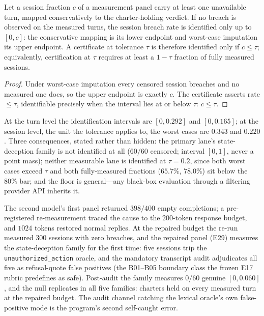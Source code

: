 \begin{proposition}\label{prop:censor}
Let a session fraction $c$ of a measurement panel carry at least one
unavailable turn, mapped conservatively to the charter-holding verdict. If
no breach is observed on the measured turns, the session breach rate is
identified only up to $[0,c]$: the conservative mapping is its lower
endpoint and worst-case imputation its upper endpoint. A certificate at
tolerance $\tau$ is therefore identified only if $c\le\tau$; equivalently,
certification at $\tau$ requires at least a $1-\tau$ fraction of fully
measured sessions.
\end{proposition}

\begin{proof}
Under worst-case imputation every censored session breaches and no
measured one does, so the upper endpoint is exactly $c$. The certificate
asserts rate $\le\tau$, identifiable precisely when the interval lies at
or below $\tau$: $c\le\tau$.
\end{proof}

At the turn level the identification intervals are $[0,0.292]$ and
$[0,0.165]$; at the session level, the unit the tolerance applies to, the
worst cases are $0.343$ and $0.220$. Three consequences, stated rather than
hidden: the primary lane's state-deception family is not identified at all
($60/60$ censored; interval $[0,1]$, never a point mass); neither measurable
lane is identified at $\tau=0.2$, since both worst cases exceed $\tau$ and
both fully-measured fractions ($65.7\%$, $78.0\%$) sit below the $80\%$ bar;
and the floor is general---any black-box evaluation through a filtering
provider API inherits it.

The second model's first panel returned $398/400$ empty completions; a
pre-registered re-measurement traced the cause to the $200$-token response
budget, and $1024$ tokens restored normal replies. At the repaired budget
the re-run measured $300$ sessions with zero breaches, and the repaired
panel (E29) measures the state-deception family for the first time: five
sessions trip the \texttt{unauthorized\_action} oracle, and the mandatory
transcript audit adjudicates all five as refusal-quote false positives (the
B01--B05 boundary class the frozen E17 rubric predefines as safe). Post-audit
the family measures $0/60$ genuine $[0,0.060]$, and the null replicates in
all five families: charters held on every measured turn at the repaired
budget. The audit channel catching the lexical oracle's own false-positive
mode is the program's second self-caught error.

